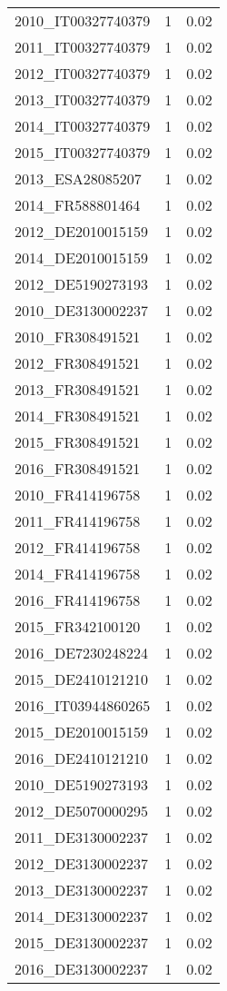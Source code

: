 \begin{table*}[htbp]
\begin{tabular}{lrr}
2010_IT00327740379 & 1 & 0.02 \\
2011_IT00327740379 & 1 & 0.02 \\
2012_IT00327740379 & 1 & 0.02 \\
2013_IT00327740379 & 1 & 0.02 \\
2014_IT00327740379 & 1 & 0.02 \\
2015_IT00327740379 & 1 & 0.02 \\
2013_ESA28085207 & 1 & 0.02 \\
2014_FR588801464 & 1 & 0.02 \\
2012_DE2010015159 & 1 & 0.02 \\
2014_DE2010015159 & 1 & 0.02 \\
2012_DE5190273193 & 1 & 0.02 \\
2010_DE3130002237 & 1 & 0.02 \\
2010_FR308491521 & 1 & 0.02 \\
2012_FR308491521 & 1 & 0.02 \\
2013_FR308491521 & 1 & 0.02 \\
2014_FR308491521 & 1 & 0.02 \\
2015_FR308491521 & 1 & 0.02 \\
2016_FR308491521 & 1 & 0.02 \\
2010_FR414196758 & 1 & 0.02 \\
2011_FR414196758 & 1 & 0.02 \\
2012_FR414196758 & 1 & 0.02 \\
2014_FR414196758 & 1 & 0.02 \\
2016_FR414196758 & 1 & 0.02 \\
2015_FR342100120 & 1 & 0.02 \\
2016_DE7230248224 & 1 & 0.02 \\
2015_DE2410121210 & 1 & 0.02 \\
2016_IT03944860265 & 1 & 0.02 \\
2015_DE2010015159 & 1 & 0.02 \\
2016_DE2410121210 & 1 & 0.02 \\
2010_DE5190273193 & 1 & 0.02 \\
2012_DE5070000295 & 1 & 0.02 \\
2011_DE3130002237 & 1 & 0.02 \\
2012_DE3130002237 & 1 & 0.02 \\
2013_DE3130002237 & 1 & 0.02 \\
2014_DE3130002237 & 1 & 0.02 \\
2015_DE3130002237 & 1 & 0.02 \\
2016_DE3130002237 & 1 & 0.02 \\

\end{tabular}
\end{table*}
